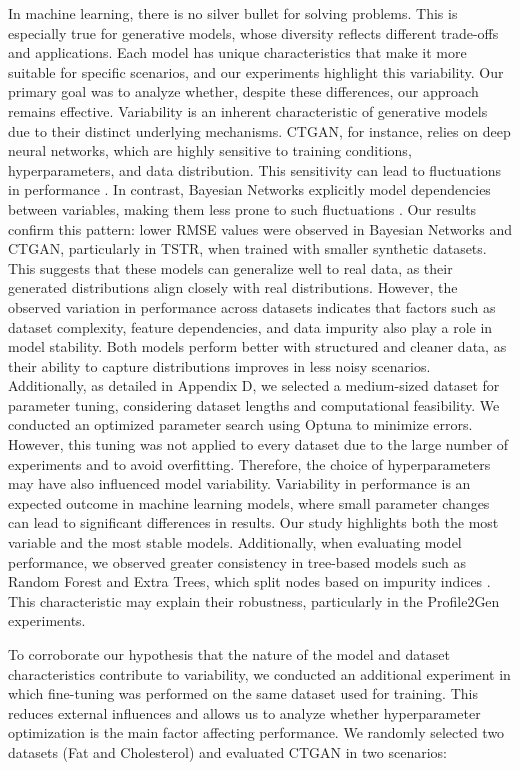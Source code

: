 \documentclass{article}
\theoremstyle{plain}
\theoremstyle{definition}
\theoremstyle{remark}
\begin{document}
In machine learning, there is no silver bullet for solving problems. This is especially true for generative models, whose diversity reflects different trade-offs and applications. Each model has unique characteristics that make it more suitable for specific scenarios, and our experiments highlight this variability. Our primary goal was to analyze whether, despite these differences, our approach remains effective.
Variability is an inherent characteristic of generative models due to their distinct underlying mechanisms. CTGAN, for instance, relies on deep neural networks, which are highly sensitive to training conditions, hyperparameters, and data distribution. This sensitivity can lead to fluctuations in performance  \cite{xu2019modeling}. In contrast, Bayesian Networks explicitly model dependencies between variables, making them less prone to such fluctuations  \cite{heckerman2022tutoriallearningbayesiannetworks}. Our results confirm this pattern: lower RMSE values were observed in Bayesian Networks and CTGAN, particularly in TSTR, when trained with smaller synthetic datasets. This suggests that these models can generalize well to real data, as their generated distributions align closely with real distributions. However, the observed variation in performance across datasets indicates that factors such as dataset complexity, feature dependencies, and data impurity also play a role in model stability.
Both models perform better with structured and cleaner data, as their ability to capture distributions improves in less noisy scenarios. Additionally, as detailed in Appendix D, we selected a medium-sized dataset for parameter tuning, considering dataset lengths and computational feasibility. We conducted an optimized parameter search using Optuna to minimize errors. However, this tuning was not applied to every dataset due to the large number of experiments and to avoid overfitting. Therefore, the choice of hyperparameters may have also influenced model variability.
Variability in performance is an expected outcome in machine learning models, where small parameter changes can lead to significant differences in results. Our study highlights both the most variable and the most stable models. Additionally, when evaluating model performance, we observed greater consistency in tree-based models such as Random Forest and Extra Trees, which split nodes based on impurity indices \cite{james2013introduction}. This characteristic may explain their robustness, particularly in the Profile2Gen experiments.

To corroborate our hypothesis that the nature of the model and dataset characteristics contribute to variability, we conducted an additional experiment in which fine-tuning was performed on the same dataset used for training. This reduces external influences and allows us to analyze whether hyperparameter optimization is the main factor affecting performance.
We randomly selected two datasets (Fat and Cholesterol) and evaluated CTGAN in two scenarios:
\end{document}
